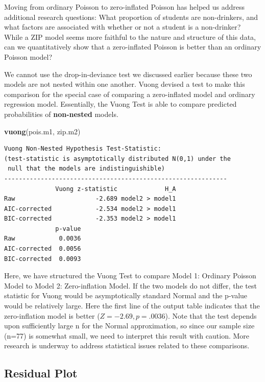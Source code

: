 \documentclass[
]{krantz}
\newenvironment{Shaded}{\begin{snugshade}}{\end{snugshade}}
\newcommand{\KeywordTok}[1]{\textcolor[rgb]{0.27,0.27,0.27}{\textbf{#1}}}
\newcommand{\NormalTok}[1]{#1}
\begin{document}
Moving from ordinary Poisson to zero-inflated Poisson has helped us address additional research questions: What proportion of students are non-drinkers, and what factors are associated with whether or not a student is a non-drinker? While a ZIP model seems more faithful to the nature and structure of this data, can we quantitatively show that a zero-inflated Poisson is better than an ordinary Poisson model?

We cannot use the drop-in-deviance test we discussed earlier because these two models are not nested within one another. Vuong \citeyearpar{Vuong1989} devised a test to make this comparison for the special case of comparing a zero-inflated model and ordinary regression model. Essentially, the Vuong Test  is able to compare predicted probabilities of \textbf{non-nested} models.

\begin{Shaded}
\begin{Highlighting}[]
\KeywordTok{vuong}\NormalTok{(pois.m1, zip.m2)}
\end{Highlighting}
\end{Shaded}

\begin{verbatim}
Vuong Non-Nested Hypothesis Test-Statistic: 
(test-statistic is asymptotically distributed N(0,1) under the
 null that the models are indistinguishible)
-------------------------------------------------------------
              Vuong z-statistic             H_A
Raw                      -2.689 model2 > model1
AIC-corrected            -2.534 model2 > model1
BIC-corrected            -2.353 model2 > model1
              p-value
Raw            0.0036
AIC-corrected  0.0056
BIC-corrected  0.0093
\end{verbatim}

Here, we have structured the Vuong Test to compare Model 1: Ordinary Poisson Model to Model 2: Zero-inflation Model. If the two models do not differ, the test statistic for Vuong would be asymptotically standard Normal and the p-value would be relatively large. Here the first line of the output table indicates that the zero-inflation model is better (\(Z=-2.69,p=.0036\)). Note that the test depends upon sufficiently large n for the Normal approximation, so since our sample size (n=77) is somewhat small, we need to interpret this result with caution. More research is underway to address statistical issues related to these comparisons.

\hypertarget{residual-plot}{%
\subsection{Residual Plot}\label{residual-plot}}
\end{document}
